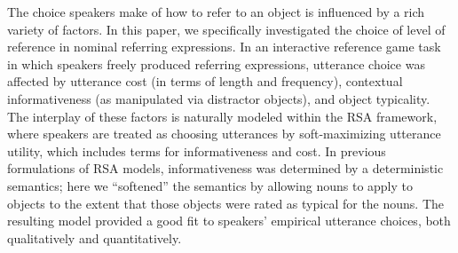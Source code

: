 \documentclass[10pt,letterpaper]{article}
\newcommand{\jd}[1]{\textcolor{Blue}{[jd: #1]}}
\begin{document}
The choice speakers make of how to refer to an object is influenced by a rich variety of factors.
In this paper, we specifically investigated the choice of level of reference in nominal referring expressions. In an interactive reference game task in which speakers freely produced referring expressions, utterance choice was affected by utterance cost (in terms of length and frequency), contextual informativeness (as manipulated via distractor objects), and object typicality.
%
The interplay of these factors is naturally modeled within the RSA framework, where speakers are treated as choosing utterances by soft-maximizing utterance utility, which includes terms for informativeness and cost. In previous formulations of RSA models, informativeness was determined by a deterministic semantics; here we ``softened'' the semantics by allowing nouns to apply to objects to the extent that those objects were rated as typical for the nouns.
The resulting model provided a good fit to speakers' empirical utterance choices, both qualitatively and quantitatively. 





\end{document}
